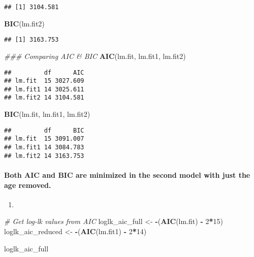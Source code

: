 \documentclass[]{article}
\newenvironment{Shaded}{\begin{snugshade}}{\end{snugshade}}
\newcommand{\CommentTok}[1]{\textcolor[rgb]{0.56,0.35,0.01}{\textit{#1}}}
\newcommand{\DecValTok}[1]{\textcolor[rgb]{0.00,0.00,0.81}{#1}}
\newcommand{\KeywordTok}[1]{\textcolor[rgb]{0.13,0.29,0.53}{\textbf{#1}}}
\newcommand{\NormalTok}[1]{#1}
\newcommand{\OperatorTok}[1]{\textcolor[rgb]{0.81,0.36,0.00}{\textbf{#1}}}
\newcommand{\StringTok}[1]{\textcolor[rgb]{0.31,0.60,0.02}{#1}}
\let\oldparagraph\paragraph
\renewcommand{\paragraph}[1]{\oldparagraph{#1}\mbox{}}
\begin{document}
\begin{verbatim}
## [1] 3104.581
\end{verbatim}

\begin{Shaded}
\begin{Highlighting}[]
\KeywordTok{BIC}\NormalTok{(lm.fit2)}
\end{Highlighting}
\end{Shaded}

\begin{verbatim}
## [1] 3163.753
\end{verbatim}

\begin{Shaded}
\begin{Highlighting}[]
\CommentTok{### Comparing AIC & BIC}
\KeywordTok{AIC}\NormalTok{(lm.fit, lm.fit1, lm.fit2)}
\end{Highlighting}
\end{Shaded}

\begin{verbatim}
##         df      AIC
## lm.fit  15 3027.609
## lm.fit1 14 3025.611
## lm.fit2 14 3104.581
\end{verbatim}

\begin{Shaded}
\begin{Highlighting}[]
\KeywordTok{BIC}\NormalTok{(lm.fit, lm.fit1, lm.fit2)}
\end{Highlighting}
\end{Shaded}

\begin{verbatim}
##         df      BIC
## lm.fit  15 3091.007
## lm.fit1 14 3084.783
## lm.fit2 14 3163.753
\end{verbatim}

\hypertarget{both-aic-and-bic-are-minimized-in-the-second-model-with-just-the-age-removed.}{%
\paragraph{Both AIC and BIC are minimized in the second model with just
the age
removed.}\label{both-aic-and-bic-are-minimized-in-the-second-model-with-just-the-age-removed.}}

\begin{enumerate}
\def\labelenumi{(\alph{enumi})}
\setcounter{enumi}{1}
\item
\end{enumerate}

\begin{Shaded}
\begin{Highlighting}[]
\CommentTok{# Get log-lk values from AIC}
\NormalTok{loglk_aic_full <-}\StringTok{ }\OperatorTok{-}\NormalTok{(}\KeywordTok{AIC}\NormalTok{(lm.fit) }\OperatorTok{-}\StringTok{ }\DecValTok{2}\OperatorTok{*}\DecValTok{15}\NormalTok{)}
\NormalTok{loglk_aic_reduced <-}\StringTok{ }\OperatorTok{-}\NormalTok{(}\KeywordTok{AIC}\NormalTok{(lm.fit1) }\OperatorTok{-}\StringTok{ }\DecValTok{2}\OperatorTok{*}\DecValTok{14}\NormalTok{)}

\NormalTok{loglk_aic_full}
\end{Highlighting}
\end{Shaded}
\end{document}
